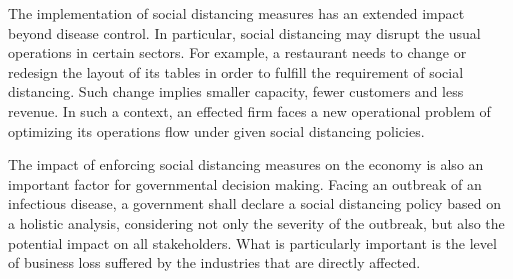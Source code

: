 The implementation of social distancing measures has an extended impact beyond disease control.  In particular, social distancing may disrupt the usual operations in certain sectors. For example, a restaurant needs to change or redesign the layout of its tables in order to fulfill the requirement of social distancing. Such change implies smaller capacity, fewer customers and less revenue. In such a context, an effected firm faces a new operational problem of optimizing its operations flow under given social distancing policies.

The impact of enforcing social distancing measures on the economy is also an important factor for governmental decision making. Facing an outbreak of an infectious disease, a government shall declare a social distancing policy based on a holistic analysis, considering not only the severity of the outbreak, but also the potential impact on all stakeholders. What is particularly important is the level of business loss suffered by the industries that are directly affected.
 





